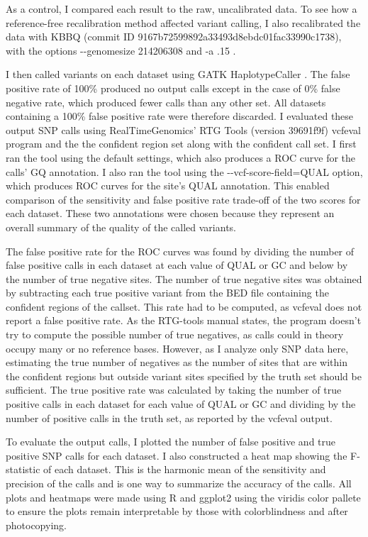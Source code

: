 As a control, I compared each result to the raw, uncalibrated data. To see how a reference-free recalibration method affected variant calling, I also recalibrated the data with KBBQ (commit ID 9167b72599892a33493d8ebdc01fac33990c1738), with the options -\phantom{}-genomesize 214206308 and -a .15 .

I then called variants on each dataset using GATK HaplotypeCaller \parencite{poplin_scaling_2018}. The false positive rate of 100\% produced no output calls except in the case of 0\% false negative rate, which produced fewer calls than any other set. All datasets containing a 100\% false positive rate were therefore discarded. I evaluated these output SNP calls using RealTimeGenomics' RTG Tools (version 39691f9f) vcfeval program \parencite{cleary_comparing_2015} and the the confident region set along with the confident call set. I first ran the tool using the default settings, which also produces a ROC curve for the calls' GQ annotation. I also ran the tool using the -\phantom{}-vcf-score-field=QUAL option, which produces ROC curves for the site's QUAL annotation. This enabled comparison of the sensitivity and false positive rate trade-off of the two scores for each dataset. These two annotations were chosen because they represent an overall summary of the quality of the called variants.

The false positive rate for the ROC curves was found by dividing the number of false positive calls in each dataset at each value of QUAL or GC and below by the number of true negative sites. The number of true negative sites was obtained by subtracting each true positive variant from the BED file containing the confident regions of the callset. This rate had to be computed, as vcfeval does not report a false positive rate. As the RTG-tools manual states, the program doesn't try to compute the possible number of true negatives, as calls could in theory occupy many or no reference bases. However, as I analyze only SNP data here,  estimating the true number of negatives as the number of sites that are within the confident regions but outside variant sites specified by the truth set should be sufficient. The true positive rate was calculated by taking the number of true positive calls in each dataset for each value of QUAL or GC and dividing by the number of positive calls in the truth set, as reported by the vcfeval output.

To evaluate the output calls, I plotted the number of false positive and true positive SNP calls for each dataset. I also constructed a heat map showing the F-statistic of each dataset. This is the harmonic mean of the sensitivity and precision of the calls and is one way to summarize the accuracy of the calls. All plots and heatmaps were made using R \parencite{r_core_2020} and ggplot2 \parencite{wickham_ggplot2_2016} using the viridis color pallete \parencite{garnier_viridis_2018} to ensure the plots remain interpretable by those with colorblindness and after photocopying.

